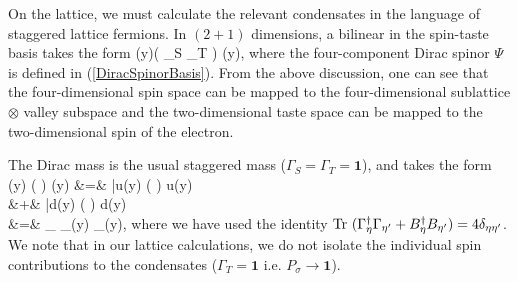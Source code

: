 \documentclass[aps,prd,twocolumn,showpacs,superscriptaddress,groupedaddress]{revtex4}  %
\begin{document}
On the lattice, we must calculate the relevant condensates in the language of staggered lattice fermions. In $(2+1)$ dimensions, a bilinear in the spin-taste basis takes the form
\beq
\label{SpinTasteBilinear}
\Bpsi(y)\left( \Gamma_S \otimes \Gamma_T \right) \Psi(y),
\eeq
where the four-component Dirac spinor $\Psi$ is defined in (\ref{DiracSpinorBasis}). From the above discussion, one can see that the four-dimensional spin space can be mapped to the 
four-dimensional sublattice $\otimes$ valley subspace and the two-dimensional taste space can be mapped to the two-dimensional spin of the electron. 

The Dirac mass is the usual staggered mass ($\Gamma_S = \Gamma_T = \bm 1$), and takes the form 
\beq
\label{Condensate}
\nn
\Bpsi(y) \left(  \otimes {} \right) \Psi(y) &=& \bar{u}(y) \left(  \otimes {} \right) u(y) \\ \nn
 &+& \bar{d}(y) \left(  \otimes {} \right) d(y) \\
&=&  \sum_{\eta} \chib_{\eta}(y) \chi_{\eta}(y),
\eeq
where we have used the identity $\mathop{{\hbox{Tr} \, }}\nolimits{(\Gamma^{\dagger}_{\eta}\Gamma_{\eta'} + B^{\dagger}_{\eta}B_{\eta'})} = 4 \delta_{\eta \eta'}$. We note that in our lattice calculations, we do not isolate the 
individual spin contributions to the condensates ($\Gamma_T = \bm 1$ i.e. $P_{\sigma} \to \bm 1$). 
\end{document}
